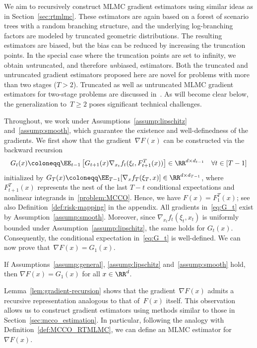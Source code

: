 \documentclass[11pt]{article}
\begin{document}
We aim to recursively construct MLMC gradient estimators using similar ideas as in Section~\ref{sec:rtmlmc}. These estimators are again based on a forest of scenario trees with a random branching structure, and the underlying log-branching factors are modeled by truncated geometric distributions. The resulting estimators are biased, but the bias can be reduced by increasing the truncation points. In the special case where the truncation points are set to infinity, we obtain {\em un}truncated, and therefore {\em un}biased, estimators. Both the truncated and untruncated gradient estimators proposed here are novel for problems with more than two stages ($T>2$). Truncated as well as untruncated MLMC gradient estimators for two-stage problems are discussed in~\citep{hu2021bias, goda2023constructing}. As will become clear below, the generalization to~$T\geq 2$ poses significant technical challenges.



Throughout, we work under Assumptions~\ref{assump:lipschitz} and~\ref{assump:smooth}, which guarantee the existence and well-defined\-ness of the gradients. We first show that the gradient~$\nabla F(x)$ can be constructed via the backward recursion
\begin{align}\label{eq:G_t}
    G_t(x) \coloneqq \EE_{t-1}\left[G_{t+1}(x) \nabla_{x_t} f_t(\xi_t, F_{t+1}^T(x))\right]\in\RR^{d\times d_{t-1}}\quad \forall t\in[T-1]
\end{align}
initialized by $G_T(x) \coloneqq \EE_{T-1}[\nabla_x f_T(\xi_T, x)]\in\RR^{d\times d_{T-1}}$, where~$F_{t+1}^T(x)$ represents the nest of the last $T-t$ conditional expectations and nonlinear integrands in~\eqref{problem:MCCO}. Hence, we have $F(x)=F^T_1(x)$; see also Definition~\ref{def:risk-mapping} in the appendix. All gradients in~\eqref{eq:G_t} exist by Assumption~\ref{assump:smooth}. Moreover, since $\nabla_{x_t} f_t(\xi_t, x_t)$ is uniformly bounded under Assumption~\ref{assump:lipschitz}, the same holds for $G_t(x)$. Consequently, the conditional expectation in~\eqref{eq:G_t} is well-defined. We can now prove that~$\nabla F(x)= G_1(x)$. 


\begin{lemma}
\label{lem:gradient-recursion}
If Assumptions~\ref{assump:general}, \ref{assump:lipschitz} and~\ref{assump:smooth} hold, then $\nabla F(x)= G_1(x)$ for all $x\in\RR^{d}$.
\end{lemma}

Lemma~\ref{lem:gradient-recursion} shows that the gradient~$\nabla F(x)$ admits a recursive representation analogous to that of~$F(x)$ itself. This observation allows us to construct gradient estimators using methods similar to those in Section~\ref{sec:mcco_estimation}. In particular, following the analogy with Definition~\ref{def:MCCO_RTMLMC}, we can define an MLMC estimator for~$\nabla F(x)$.
\end{document}
